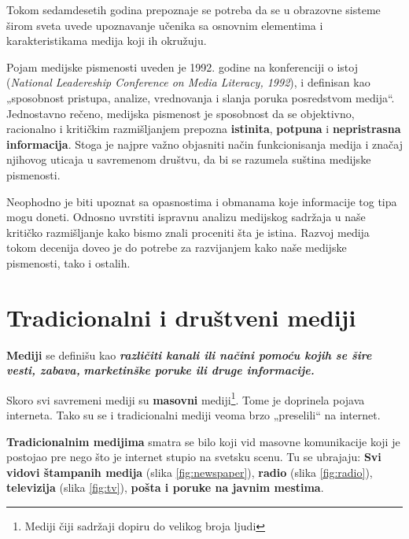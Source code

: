 \documentclass[a4paper]{article}
\begin{document}
Tokom sedamdesetih godina prepoznaje se potreba da se u obrazovne sisteme širom sveta uvede upoznavanje učenika sa osnovnim elementima i karakteristikama medija koji ih okružuju. 

Pojam medijske pismenosti uveden je 1992. godine na konferenciji o istoj (\emph{National Leadereship Conference on Media Literacy, 1992}), i definisan kao „sposobnost pristupa, analize, vrednovanja i slanja poruka posredstvom medija“. Jednostavno rečeno, medijska pismenost je sposobnost da se objektivno, racionalno i kritičkim razmišljanjem prepozna \textbf{istinita}, \textbf{potpuna} i \textbf{nepristrasna informacija}.  
Stoga je najpre važno objasniti način funkcionisanja medija i značaj njihovog uticaja u savremenom društvu, da bi se razumela suština medijske pismenosti.

Neophodno je biti upoznat sa opasnostima i obmanama koje informacije tog tipa mogu doneti. Odnosno uvrstiti ispravnu analizu medijskog sadržaja u naše kritičko razmišljanje kako bismo znali proceniti šta je istina. Razvoj medija tokom decenija doveo je do potrebe za razvijanjem kako naše medijske pismenosti, tako i ostalih.

\newpage

\section{Tradicionalni i društveni mediji}

	\textbf{{Mediji}} se definišu kao \emph{\textbf{{različiti kanali ili
			načini pomoću kojih se šire vesti, zabava,}}} \emph{\textbf{{marketinške
			poruke ili druge informacije.}}}

Skoro svi savremeni mediji su \textbf{masovni} mediji\footnote{Mediji čiji sadržaji dopiru do velikog broja ljudi}. Tome je doprinela
pojava interneta. Tako su se i tradicionalni mediji veoma brzo
„preselili`` na internet.


\textbf{Tradicionalnim medijima} smatra se bilo koji vid masovne komunikacije koji je postojao pre nego što je internet stupio na svetsku scenu. Tu se ubrajaju: 
    \textbf {Svi vidovi štampanih medija} (slika \ref{fig:newspaper}), 
    \textbf {radio} (slika \ref{fig:radio}),
    \textbf {televizija} (slika \ref{fig:tv}),
    \textbf {pošta i poruke na javnim mestima}.
\end{document}
